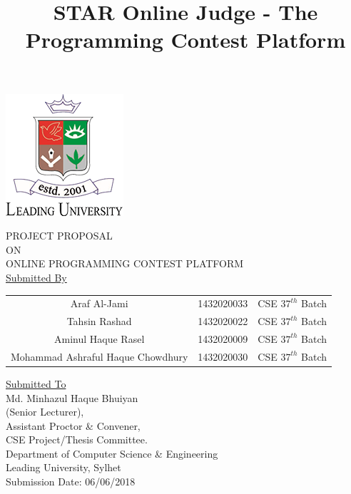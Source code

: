 \documentclass[a4paper]{report}
\title{STAR Online Judge - The Programming Contest Platform}
\date{}
\begin{document}
\pagestyle{empty}
\begin{centering}
    \includegraphics{Graphics/logo.png} \\
    \vspace{20pt}

    \Large{PROJECT PROPOSAL} \\
    \Large{ON} \\
    \Large{ONLINE PROGRAMMING CONTEST PLATFORM} \\
    \vspace{10pt}
    \Large{\underline{Submitted By}} \\
    \vspace{20pt}
    \begin{tabular}{c r r}
        \vspace{9pt}
        {\Large Araf Al-Jami} & {\Large 1432020033} & {\Large CSE $37^{th}$ Batch} \\
        \vspace{9pt}
        {\Large Tahsin Rashad} & {\Large 1432020022} & {\Large CSE $37^{th}$ Batch} \\
        \vspace{9pt}
        {\Large Aminul Haque Rasel} & {\Large 1432020009} & {\Large CSE $37^{th}$ Batch} \\
        \vspace{9pt}
        {\Large Mohammad Ashraful Haque Chowdhury} & {\Large 1432020030} & {\Large CSE $37^{th}$ Batch} \\
    \end{tabular}


    \vspace{30pt}
    \Large{\underline{Submitted To}} \\
    \LARGE{Md. Minhazul Haque Bhuiyan} \\
    \Large{(Senior Lecturer),} \\
    \Large{Assistant Proctor \& Convener,} \\
    \Large{CSE Project/Thesis Committee.} \\
    \Large{Department of Computer Science \& Engineering} \\
    \Large{Leading University, Sylhet} \\
    \vspace{80pt}
    \Large{Submission Date: 06/06/2018}\\
\end{centering}
\pagebreak
\Large{}

\Large{}
\pagebreak
\end{document}
